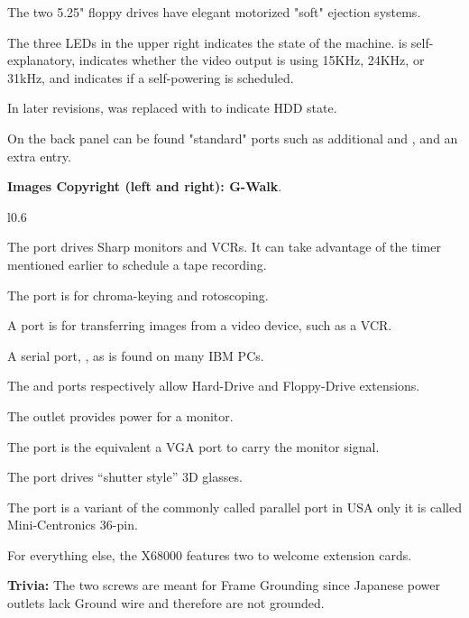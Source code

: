 The two 5.25" floppy drives have elegant motorized "soft" ejection systems.

The three LEDs in the upper right indicates the state of the machine.  is self-explanatory,  indicates whether the video output is using 15KHz, 24KHz, or 31kHz, and  indicates if a self-powering is scheduled. 

In later revisions,  was replaced with  to indicate HDD state.

On the back panel can be found "standard" ports such as additional  and , and an extra  entry.  

\textbf{Images Copyright (left and right): G-Walk\cite{x68k_perfect_catalogue}}.
\pagebreak

\begin{wrapfigure}[35]{l}{0.6\textwidth}
\centering
{}
\end{wrapfigure}



The  port drives Sharp monitors and VCRs. It can take advantage of the timer mentioned earlier to schedule a tape recording.

The  port is for chroma-keying and rotoscoping.

A  port is for transferring images from a video device, such as a VCR.

A serial port, , as is found on many IBM PCs.



The  and  ports respectively allow Hard-Drive and Floppy-Drive extensions.

The  outlet provides power for a monitor.

The  port is the equivalent a VGA port to carry the monitor signal.


The  port drives “shutter style” 3D glasses.

The  port is a variant of the commonly called parallel port in USA only it is called Mini-Centronics 36-pin. 

For everything else, the X68000 features two  to welcome extension cards.

\textbf{Trivia:} The two  screws are meant for Frame Grounding since Japanese power outlets lack Ground wire and therefore are not grounded.


